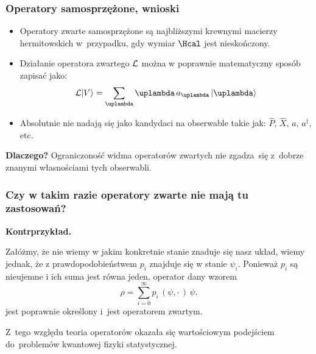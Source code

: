 \documentclass[10pt,t]{beamer}
\begin{document}
\begin{frame}
  \frametitle{Operatory samosprzężone, wnioski}


  \begin{itemize}

  \item Operatory zwarte samosprzężone są najbliższymi krewnymi macierzy
    hermitowskich w~przypadku, gdy wymiar $\Hcal$ jest nieskończony.

  \item Działanie operatora zwartego $\mathcal{L}$ można w poprawnie matematyczny
    sposób zapisać jako:
    \begin{equation}
      \label{eq:Matematyczna-strona-03}
      \Lcal | V \rangle = \sum_{ \lambda } \lambda \, a_{ \lambda } \, | \lambda \rangle
    \end{equation}

  \item Absolutnie nie nadają się jako kandydaci na obserwable takie jak:
    $\widehat{ P }$, $\widehat{ X }$, $a$, $a^{ \dagger }$, etc.

  \end{itemize}

  \textbf{Dlaczego?} Ograniczoność widma operatorów zwartych nie zgadza~się
  z~dobrze znanymi własnościami tych obserwabli.

\end{frame}





\begin{frame}
  \frametitle{Czy w takim razie operatory zwarte nie mają tu zastosowań?}


  \textbf{Kontrprzykład.}

  Załóżmy, że nie wiemy w jakim konkretnie stanie znaduje się nasz układ,
  wiemy jednak, że z prawdopodobieństwem $p_{ i }$ znajduje się w stanie
  $\psi_{ i }$. Ponieważ $p_{ i }$ są nieujemne i ich suma jest równa jeden,
  operator dany wzorem
  \begin{equation}
    \label{eq:Matematyczna-strona-04}
    \rho = \sum_{ i = 0 }^{ \infty } p_ { i } \, ( \psi, \cdot \, ) \, \psi.
  \end{equation}
  jest poprawnie określony i~jest operatorem zwartym.

  Z~tego względu teoria operatorów okazała się wartościowym podejściem
  do~problemów kwantowej fizyki statystycznej.

\end{frame}
\end{document}
